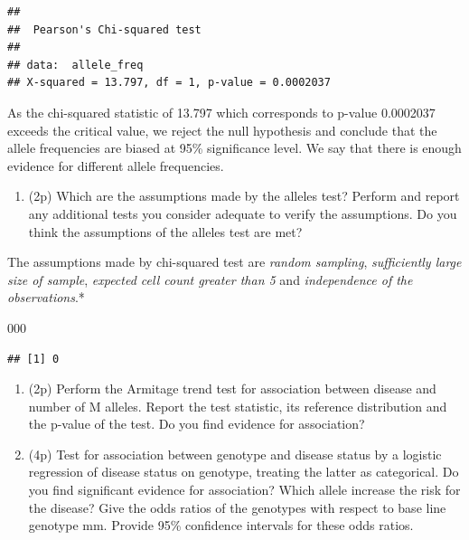 \documentclass[
]{article}
\newenvironment{Shaded}{\begin{snugshade}}{\end{snugshade}}
\newcommand{\DecValTok}[1]{\textcolor[rgb]{0.00,0.00,0.81}{#1}}
\providecommand{\tightlist}{%
  \setlength{\itemsep}{0pt}\setlength{\parskip}{0pt}}
\begin{document}
\begin{verbatim}
## 
##  Pearson's Chi-squared test
## 
## data:  allele_freq
## X-squared = 13.797, df = 1, p-value = 0.0002037
\end{verbatim}

As the chi-squared statistic of 13.797 which corresponds to p-value
0.0002037 exceeds the critical value, we reject the null hypothesis and
conclude that the allele frequencies are biased at 95\% significance
level. We say that there is enough evidence for different allele
frequencies.

\begin{enumerate}
\def\labelenumi{\arabic{enumi}.}
\setcounter{enumi}{3}
\tightlist
\item
  (2p) Which are the assumptions made by the alleles test? Perform and
  report any additional tests you consider adequate to verify the
  assumptions. Do you think the assumptions of the alleles test are met?
\end{enumerate}

The assumptions made by chi-squared test are \emph{random sampling},
\emph{sufficiently large size of sample}, \emph{expected cell count
greater than 5} and \emph{independence of the observations}.*

\begin{Shaded}
\begin{Highlighting}[]
\DecValTok{000}
\end{Highlighting}
\end{Shaded}

\begin{verbatim}
## [1] 0
\end{verbatim}

\begin{enumerate}
\def\labelenumi{\arabic{enumi}.}
\setcounter{enumi}{4}
\tightlist
\item
  (2p) Perform the Armitage trend test for association between disease
  and number of M alleles. Report the test statistic, its reference
  distribution and the p-value of the test. Do you find evidence for
  association?
\item
  (4p) Test for association between genotype and disease status by a
  logistic regression of disease status on genotype, treating the latter
  as categorical. Do you find significant evidence for association?
  Which allele increase the risk for the disease? Give the odds ratios
  of the genotypes with respect to base line genotype mm. Provide 95\%
  confidence intervals for these odds ratios.
\end{enumerate}
\end{document}

